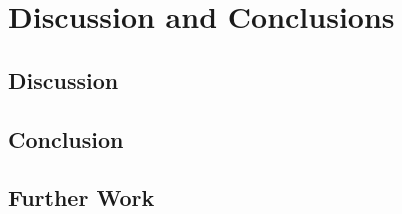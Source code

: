 \chapter{Discussion and Conclusions}

\section{Discussion}

\section{Conclusion}

\section{Further Work}

